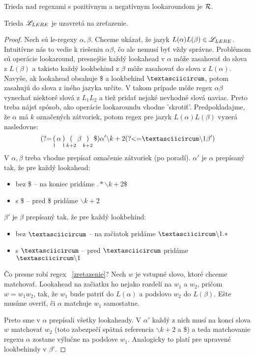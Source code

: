\begin{dosledok}
Trieda nad regexami s pozitívnym a negatívnym lookaroundom je ${\cal R}$.
\end{dosledok}

\begin{veta}
Trieda $\mathscr{L}_{LERE}$ je uzavretá na zreťazenie.
\end{veta}
\begin{proof}
Nech sú le-regexy $\alpha, \beta$. Chceme ukázať, že jazyk $L(\alpha)L(\beta) \in \mathscr{L}_{LERE}$. Intuitívne nás to vedie k riešeniu $\alpha\beta$, čo ale nemusí byť vždy správne. Problémom sú operácie lookaround, presnejšie každý lookahead v $\alpha$ môže zasahovať do slova z $L(\beta)$ a takisto každý lookbehind z $\beta$ môže zasahovať do slova z $L(\alpha)$. Navyše, ak lookahead obsahuje $\$$ a lookbehind $\textasciicircum$, potom zasahujú do slova z iného jazyka určite. V takom prípade môže regex $\alpha\beta$ vynechať niektoré slová z $L_1L_2$ a tiež pridať nejaké nevhodné slová naviac. Preto treba nájsť spôsob, ako operácie lookaroundu vhodne 'skrotiť'. Predpokladajme, že $\alpha$ má $k$ označených zátvoriek, potom regex pre jazyk $L(\alpha)L(\beta)$ vyzerá nasledovne:
\begin{equation} \label{zretazenie}
\lookahead \mathop(_1 \alpha \mathop)_1 \mathop(_{k+2}\beta \mathop)_{k+2} \mathdollar) \alpha ' \backslash k+2 \lookbehind \textasciicircum\backslash 1\beta ')
\end{equation}
V $\alpha,\beta$ treba vhodne prepísať označenie zátvoriek (po poradí). $\alpha '$ je $\alpha$ prepísaný tak, že pre každý lookahead:
\begin{itemize}
\item bez \$ -- na koniec pridáme $.* \backslash k+2 \mathdollar $
\item s \$ -- pred \$ pridáme $\backslash k+2$
\end{itemize}
$\beta '$ je $\beta$ prepísaný tak, že pre každý lookbehind:
\begin{itemize}
\item bez $\textasciicircum$ -- na začiatok pridáme $\textasciicircum \backslash 1.*$
\item s $\textasciicircum$ -- pred $\textasciicircum$ pridáme $\textasciicircum \backslash 1$
\end{itemize}
Čo presne robí regex ~\ref{zretazenie}? Nech $w$ je vstupné slovo, ktoré chceme matchovať. Lookahead na začiatku ho nejako rozdelí na $w_1$ a $w_2$, pričom $w=w_1w_2$, tak, že $w_1$ bude patriť do $L(\alpha)$ a podslovo $w_2$ do $L(\beta)$. Ešte musíme overiť, či $\alpha$ matchuje $w_1$ samostatne.

Preto sme v $\alpha$ prepísali všetky lookaheady. V $\alpha '$ každý z nich musí na konci slova $w$ matchovať $w_2$ (toto zabezpečí spätná referencia $\backslash k+2$ a \$) a teda matchovanie regexu $\alpha$ zostane výlučne na podslove $w_1$. Analogicky to platí pre upravené lookbehindy v $\beta '$.
\end{proof}

